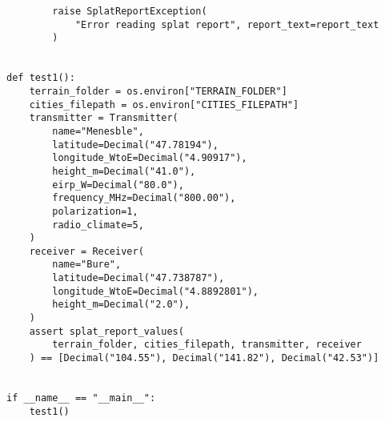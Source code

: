 \begin{verbatim}
        raise SplatReportException(
            "Error reading splat report", report_text=report_text
        )


def test1():
    terrain_folder = os.environ["TERRAIN_FOLDER"]
    cities_filepath = os.environ["CITIES_FILEPATH"]
    transmitter = Transmitter(
        name="Menesble",
        latitude=Decimal("47.78194"),
        longitude_WtoE=Decimal("4.90917"),
        height_m=Decimal("41.0"),
        eirp_W=Decimal("80.0"),
        frequency_MHz=Decimal("800.00"),
        polarization=1,
        radio_climate=5,
    )
    receiver = Receiver(
        name="Bure",
        latitude=Decimal("47.738787"),
        longitude_WtoE=Decimal("4.8892801"),
        height_m=Decimal("2.0"),
    )
    assert splat_report_values(
        terrain_folder, cities_filepath, transmitter, receiver
    ) == [Decimal("104.55"), Decimal("141.82"), Decimal("42.53")]


if __name__ == "__main__":
    test1()
\end{verbatim}